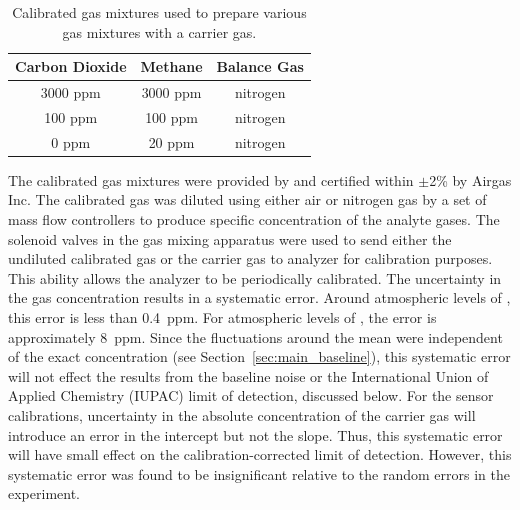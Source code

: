 \documentclass[sensors,article,submit,moreauthors,pdftex]{Definitions/mdpi}
\begin{document}
			\begin{table}[!t]
				\caption{Calibrated gas mixtures used to prepare various gas mixtures with a carrier gas.}
				\label{tab:ratios}
				\small
				\centering
				\begin{tabular}{c | c | c}
					Carbon Dioxide & Methane  & Balance Gas \\ \hline
					3000 ppm       & 3000 ppm & nitrogen    \\
					100 ppm        & 100 ppm  & nitrogen    \\
					0 ppm          & 20 ppm   & nitrogen
				\end{tabular} 
			\end{table}
			
			The calibrated gas mixtures were provided by and certified within $\pm$2\% by Airgas Inc.
			The calibrated gas was diluted using either air or nitrogen gas by a set of mass flow controllers to produce specific concentration of the analyte gases.
			The solenoid valves in the gas mixing apparatus were used to send either the undiluted calibrated gas or the carrier gas to analyzer for calibration purposes.
			This ability allows the analyzer to be periodically calibrated.
			The uncertainty in the gas concentration results in a systematic error.
			Around atmospheric levels of , this error is less than 0.4~ppm.
			For atmospheric levels of , the error is approximately 8~ppm.
			Since the fluctuations around the mean were independent of the exact concentration (see Section~\ref{sec:main_baseline}), this systematic error will not effect the results from the baseline noise or the International Union of Applied Chemistry (IUPAC) limit of detection, discussed below.
			For the sensor calibrations, uncertainty in the absolute concentration of the carrier gas will introduce an error in the intercept but not the slope.
			Thus, this systematic error will have small effect on the calibration-corrected limit of detection.
			However, this systematic error was found to be insignificant relative to the random errors in the experiment.
			
\end{document}

